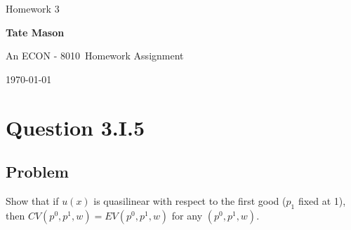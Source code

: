 \documentclass[10pt, a4paper]{article}
\newcommand\course{ECON - 8010}                            %
\newcommand\hwnumber{ 3}                                 %
\newcommand\Information{Tate Mason}                        %
\begin{document}
  \begin{titlepage}
    \begin{center}
      \vspace*{3cm}
            
        \vspace{1cm}
        \huge
        Homework \hwnumber
            
        \vspace{1.5cm}
        \Large
            
        \textbf{\Information}                      %
            
        \vfill
        
        An \course \ Homework Assignment
            
        \vspace{1cm}
        \Large

        
        \today
            
    \end{center}
  \end{titlepage}

  \newpage

  \section{Question 3.I.5}
    \subsection{Problem}
      Show that if $u(x)$ is quasilinear with respect to the first good ($p_1$ fixed at 1), then $CV(p^0,p^1,w)=EV(p^0,p^1,w)$ for any $(p^0,p^1,w)$.
\end{document}
